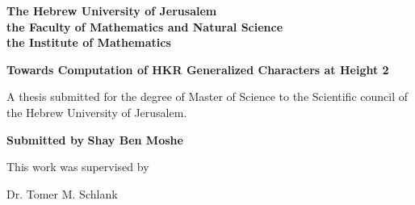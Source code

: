 \begin{titlepage}
	\begin{center}
		
		\Large
		\textbf{The Hebrew University of Jerusalem}\\
		\textbf{the Faculty of Mathematics and Natural Science}\\
		\textbf{the Institute of Mathematics}
		
		\vfill
		
		\textbf{Towards Computation of HKR Generalized Characters at Height 2}
		\vfill
		
		A thesis submitted for the degree of Master of Science to the Scientific council of the Hebrew University of Jerusalem.
		
		\vfill
		
		\textbf{Submitted by}
		\textbf{Shay Ben Moshe}
		\vfill
		
		\vfill
		This work was supervised by
		
		Dr. Tomer M. Schlank
	\end{center}
\end{titlepage}

